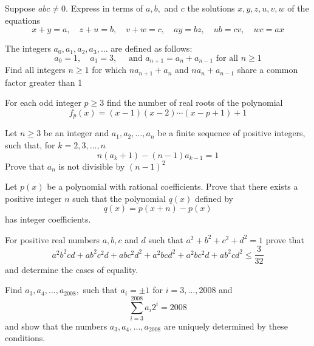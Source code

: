 \documentclass{pset}
\begin{document}
\begin{problems}
\begin{problem}[IrMO 2011 Q1]
    Suppose \(a b c \neq 0 .\) Express in terms of \(a, b,\) and \(c\) the solutions \(x, y, z, u, v, w\) of the equations
    $$
    x+y=a, \quad z+u=b, \quad v+w=c, \quad a y=b z, \quad u b=c v, \quad w c=a x
    $$
\end{problem}

\begin{problem}[IrMO 2011 Q3]
    The integers \(a_{0}, a_{1}, a_{2}, a_{3}, \ldots\) are defined as follows:
    $$
    a_{0}=1, \quad a_{1}=3, \quad \text { and } a_{n+1}=a_{n}+a_{n-1} \text { for all } n \geq 1
    $$
    Find all integers \(n \geq 1\) for which \(n a_{n+1}+a_{n}\) and \(n a_{n}+a_{n-1}\) share a common factor greater than 1
\end{problem}

\begin{problem}[IrMO 2010 Q7]
    For each odd integer \(p \geq 3\) find the number of real roots of the polynomial
    $$
    f_{p}(x)=(x-1)(x-2) \cdots(x-p+1)+1
    $$
\end{problem}

\begin{problem}[IrMO 2010 Q9]
    Let \(n \geq 3\) be an integer and \(a_{1}, a_{2}, \ldots, a_{n}\) be a finite sequence of positive integers, such that, for \(k=2,3, \ldots, n\)
    $$
    n\left(a_{k}+1\right)-(n-1) a_{k-1}=1
    $$
    Prove that \(a_{n}\) is not divisible by \((n-1)^{2}\)
\end{problem}

\begin{problem}[IrMO 2009 Q6]
    Let \(p(x)\) be a polynomial with rational coefficients. Prove that there exists a positive integer \(n\) such that the polynomial \(q(x)\) defined by
    $$
    q(x)=p(x+n)-p(x)
    $$
    has integer coefficients.
\end{problem}


\begin{problem}[IrMO 2008 Q2]
    For positive real numbers \(a, b, c\) and \(d\) such that \(a^{2}+b^{2}+c^{2}+d^{2}=1\) prove that
    $$
    a^{2} b^{2} c d+a b^{2} c^{2} d+a b c^{2} d^{2}+a^{2} b c d^{2}+a^{2} b c^{2} d+a b^{2} c d^{2} \leq \frac{3}{32}
    $$
    and determine the cases of equality.
\end{problem}

\begin{problem}[IrMO 2008 Q8]
    Find \(a_{3}, a_{4}, \ldots, a_{2008},\) such that \(a_{i}=\pm 1\) for \(i=3, \ldots, 2008\) and
    $$\sum_{i=3}^{2008} a_{i} 2^{i}=2008$$
    and show that the numbers \(a_{3}, a_{4}, \ldots, a_{2008}\) are uniquely determined by these conditions.
\end{problem}


\end{problems}
\end{document}
